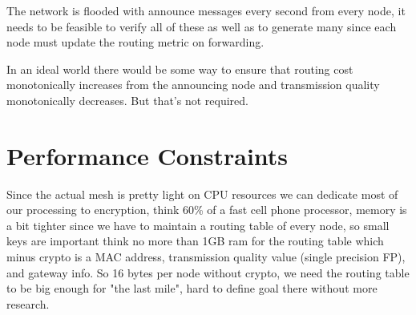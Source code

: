 \documentclass[11pt]{article}
\begin{document}
The network is flooded with announce messages every second from every node, it needs to be feasible to verify all of these as well as to generate many since each node must update the routing metric on forwarding. 

In an ideal world there would be some way to ensure that routing cost monotonically increases from the announcing node and transmission quality monotonically decreases. But that's not required.

\section{Performance Constraints}

Since the actual mesh is pretty light on CPU resources we can dedicate most of our processing to encryption, think 60\% of a fast cell phone processor, memory is a bit tighter since we have to maintain a routing table of every node, so small keys are important think no more than 1GB ram for the routing table which minus crypto is a MAC address, transmission quality value (single precision FP), and gateway info. So 16 bytes per node without crypto, we need the routing table to be big enough for "the last mile", hard to define goal there without more research. 
\end{document}
